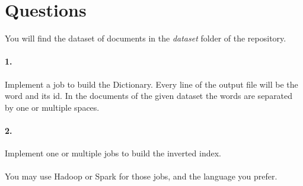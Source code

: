 \documentclass[12pt,french,titlepage]{article}
\begin{document}
\section{Questions}
You will find the dataset of documents in the \textit{dataset} folder of the repository.
\paragraph{1.} Implement a job to build the Dictionary. Every line of the output file will be the word and its id. In the documents of the given dataset the words are separated by one or multiple spaces.
\paragraph{2.} Implement one or multiple jobs to build the inverted index.
\\\\
You may use Hadoop or Spark for those jobs, and the language you prefer.
\end{document}
